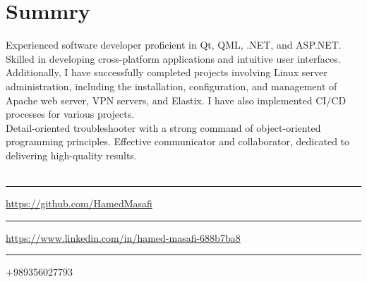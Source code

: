 \section{Summry}
Experienced software developer proficient in Qt, QML, .NET, and ASP.NET. Skilled in developing cross-platform applications and intuitive user interfaces. Additionally, I have successfully completed projects involving Linux server administration, including the installation, configuration, and management of Apache web server, VPN servers, and Elastix. I have also implemented CI/CD processes for various projects.
\\
Detail-oriented troubleshooter with a strong command of object-oriented programming principles. Effective communicator and collaborator, dedicated to delivering high-quality results.
\\
\\
\faGithub\rule{0.5cm}{0pt}\url{https://github.com/HamedMasafi}
\\
\faLinkedin\rule{0.5cm}{0pt}\url{https://www.linkedin.com/in/hamed-masafi-688b7ba8}
\\
\faPhone\rule{0.5cm}{0pt}+989356027793
